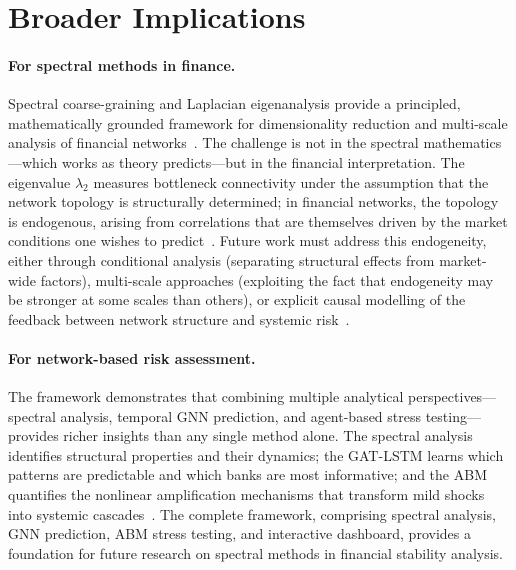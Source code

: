 \section{Broader Implications}
\label{sec:broader}

\paragraph{For spectral methods in finance.}
Spectral coarse-graining and Laplacian eigenanalysis provide a principled, mathematically grounded framework for dimensionality reduction and multi-scale analysis of financial networks~\cite{villegas2023laplacian,arenas2006synchronization}. The challenge is not in the spectral mathematics---which works as theory predicts---but in the financial interpretation. The eigenvalue $\lambda_2$ measures bottleneck connectivity under the assumption that the network topology is structurally determined; in financial networks, the topology is endogenous, arising from correlations that are themselves driven by the market conditions one wishes to predict~\cite{may1972will,mora2011biological}. Future work must address this endogeneity, either through conditional analysis (separating structural effects from market-wide factors), multi-scale approaches (exploiting the fact that endogeneity may be stronger at some scales than others), or explicit causal modelling of the feedback between network structure and systemic risk~\cite{battiston2012debtrank,battiston2016price}.

\paragraph{For network-based risk assessment.}
The framework demonstrates that combining multiple analytical perspectives---spectral analysis, temporal GNN prediction, and agent-based stress testing---provides richer insights than any single method alone. The spectral analysis identifies structural properties and their dynamics; the GAT-LSTM learns which patterns are predictable and which banks are most informative; and the ABM quantifies the nonlinear amplification mechanisms that transform mild shocks into systemic cascades~\cite{bardoscia2021physics,glasserman2015contagion}. The complete framework, comprising spectral analysis, GNN prediction, ABM stress testing, and interactive dashboard, provides a foundation for future research on spectral methods in financial stability analysis.


